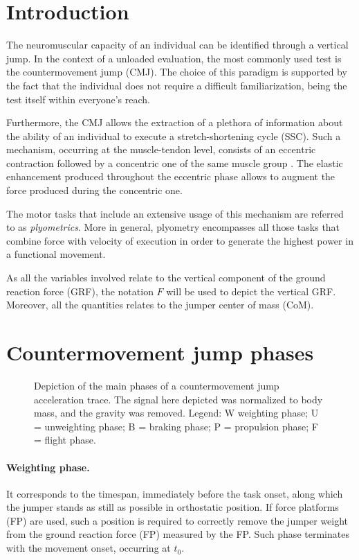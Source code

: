 \section{Introduction}
The neuromuscular capacity of an individual can be identified through a vertical jump. In the context of a unloaded evaluation, the most commonly used test is the countermovement jump (CMJ). The choice of this paradigm is supported by the fact that the individual does not require a difficult familiarization, being the test itself within everyone's reach. 

Furthermore, the CMJ allows the extraction of a plethora of information about the ability of an individual to execute a stretch-shortening cycle (SSC). Such a mechanism, occurring at the muscle-tendon level, consists of an eccentric contraction followed by a concentric one of the same muscle group \citep{neumann_kelly_kiefer_martens_grosz_2017}. The elastic enhancement produced throughout the eccentric phase allows to augment the force produced during the concentric one. 

The motor tasks that include an extensive usage of this mechanism are referred to as \textit{plyometrics}. More in general, plyometry encompasses all those tasks that combine force with velocity of execution in order to generate the highest power in a functional movement. 

As all the variables involved relate to the vertical component of the ground reaction force (GRF), the notation $F$ will be used to depict the vertical GRF. Moreover, all the quantities relates to the jumper center of mass (CoM). 

\section{Countermovement jump phases}

\begin{figure}[ht]
\centering

\caption{Depiction of the main phases of a countermovement jump acceleration trace. The signal here depicted was normalized to body mass, and the gravity was removed. Legend: W weighting phase; U = unweighting phase; B = braking phase; P = propulsion phase; F = flight phase.}
\label{fig:cmj_phases}
\end{figure}

\paragraph{Weighting phase.} It corresponds to the timespan, immediately before the task onset, along which the jumper stands as still as possible in orthostatic position. If force platforms (FP) are used, such a position is required to correctly remove the jumper weight from the ground reaction force (FP) measured by the FP. Such phase terminates with the movement onset, occurring at $t_0$. 

